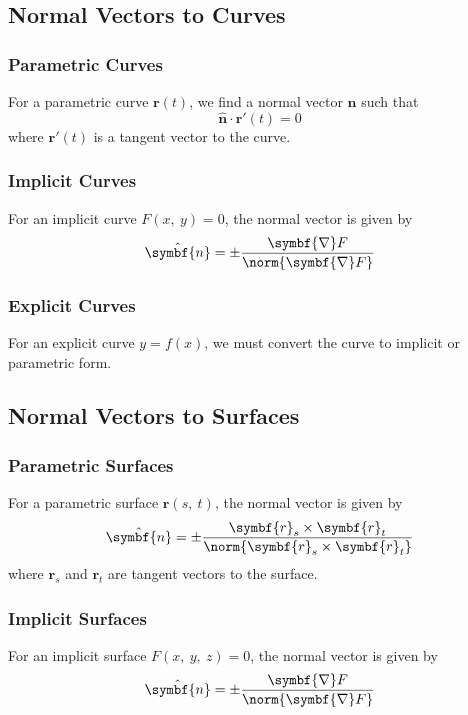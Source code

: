 \documentclass{article}
\begin{document}
\subsection{Normal Vectors to Curves}
\subsubsection{Parametric Curves}
For a parametric curve \(\symbf{r}\left( t \right)\), we find a normal
vector \(\hat{\symbf{n}}\) such that
\begin{equation*}
    \hat{\symbf{n}} \cdot \symbf{r}'\left( t \right) = 0
\end{equation*}
where \(\symbf{r}'\left( t \right)\) is a tangent vector to the curve.
\subsubsection{Implicit Curves}
For an implicit curve \(F\left( x,\: y \right) = 0\), the normal vector
is given by
\begin{equation*}
    \hat{\symbf{n}} = \pm \frac{\symbf{\nabla} F}{\norm{\symbf{\nabla} F}}
\end{equation*}
\subsubsection{Explicit Curves}
For an explicit curve \(y = f\left( x \right)\), we must convert the
curve to implicit or parametric form.
\subsection{Normal Vectors to Surfaces}
\subsubsection{Parametric Surfaces}
For a parametric surface \(\symbf{r}\left( s,\: t \right)\), the normal
vector is given by
\begin{equation*}
    \hat{\symbf{n}} = \pm \frac{\symbf{r}_s \times \symbf{r}_t}{\norm{\symbf{r}_s \times \symbf{r}_t}}
\end{equation*}
where \(\symbf{r}_s\) and \(\symbf{r}_t\) are tangent vectors to the
surface.
\subsubsection{Implicit Surfaces}
For an implicit surface \(F\left( x,\: y,\: z \right) = 0\), the normal
vector is given by
\begin{equation*}
    \hat{\symbf{n}} = \pm \frac{\symbf{\nabla} F}{\norm{\symbf{\nabla} F}}
\end{equation*}
\end{document}
